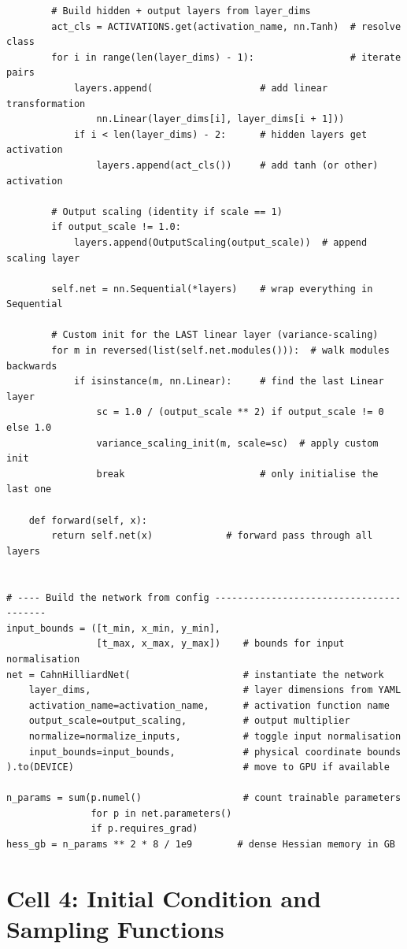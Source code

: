 \documentclass[11pt,a4paper]{article}
\begin{document}
\begin{lstlisting}
        # Build hidden + output layers from layer_dims
        act_cls = ACTIVATIONS.get(activation_name, nn.Tanh)  # resolve class
        for i in range(len(layer_dims) - 1):                 # iterate pairs
            layers.append(                   # add linear transformation
                nn.Linear(layer_dims[i], layer_dims[i + 1]))
            if i < len(layer_dims) - 2:      # hidden layers get activation
                layers.append(act_cls())     # add tanh (or other) activation

        # Output scaling (identity if scale == 1)
        if output_scale != 1.0:
            layers.append(OutputScaling(output_scale))  # append scaling layer

        self.net = nn.Sequential(*layers)    # wrap everything in Sequential

        # Custom init for the LAST linear layer (variance-scaling)
        for m in reversed(list(self.net.modules())):  # walk modules backwards
            if isinstance(m, nn.Linear):     # find the last Linear layer
                sc = 1.0 / (output_scale ** 2) if output_scale != 0 else 1.0
                variance_scaling_init(m, scale=sc)  # apply custom init
                break                        # only initialise the last one

    def forward(self, x):
        return self.net(x)             # forward pass through all layers


# ---- Build the network from config ----------------------------------------
input_bounds = ([t_min, x_min, y_min],
                [t_max, x_max, y_max])    # bounds for input normalisation
net = CahnHilliardNet(                    # instantiate the network
    layer_dims,                           # layer dimensions from YAML
    activation_name=activation_name,      # activation function name
    output_scale=output_scaling,          # output multiplier
    normalize=normalize_inputs,           # toggle input normalisation
    input_bounds=input_bounds,            # physical coordinate bounds
).to(DEVICE)                              # move to GPU if available

n_params = sum(p.numel()                  # count trainable parameters
               for p in net.parameters()
               if p.requires_grad)
hess_gb = n_params ** 2 * 8 / 1e9        # dense Hessian memory in GB
\end{lstlisting}


\section{Cell 4: Initial Condition and Sampling Functions}
\label{sec:sampling}
\end{document}
